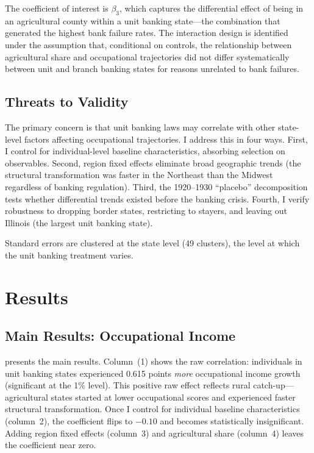 \documentclass[12pt]{article}
\begin{document}
The coefficient of interest is $\beta_3$, which captures the differential effect of being in an agricultural county within a unit banking state---the combination that generated the highest bank failure rates. The interaction design is identified under the assumption that, conditional on controls, the relationship between agricultural share and occupational trajectories did not differ systematically between unit and branch banking states for reasons unrelated to bank failures.

\subsection{Threats to Validity}

The primary concern is that unit banking laws may correlate with other state-level factors affecting occupational trajectories. I address this in four ways. First, I control for individual-level baseline characteristics, absorbing selection on observables. Second, region fixed effects eliminate broad geographic trends (the structural transformation was faster in the Northeast than the Midwest regardless of banking regulation). Third, the 1920--1930 ``placebo'' decomposition tests whether differential trends existed before the banking crisis. Fourth, I verify robustness to dropping border states, restricting to stayers, and leaving out Illinois (the largest unit banking state).

Standard errors are clustered at the state level (49 clusters), the level at which the unit banking treatment varies.


\section{Results}
\label{sec:results}

\subsection{Main Results: Occupational Income}

 presents the main results. Column~(1) shows the raw correlation: individuals in unit banking states experienced 0.615 points \textit{more} occupational income growth (significant at the 1\% level). This positive raw effect reflects rural catch-up---agricultural states started at lower occupational scores and experienced faster structural transformation. Once I control for individual baseline characteristics (column~2), the coefficient flips to $-0.10$ and becomes statistically insignificant. Adding region fixed effects (column~3) and agricultural share (column~4) leaves the coefficient near zero.
\end{document}
